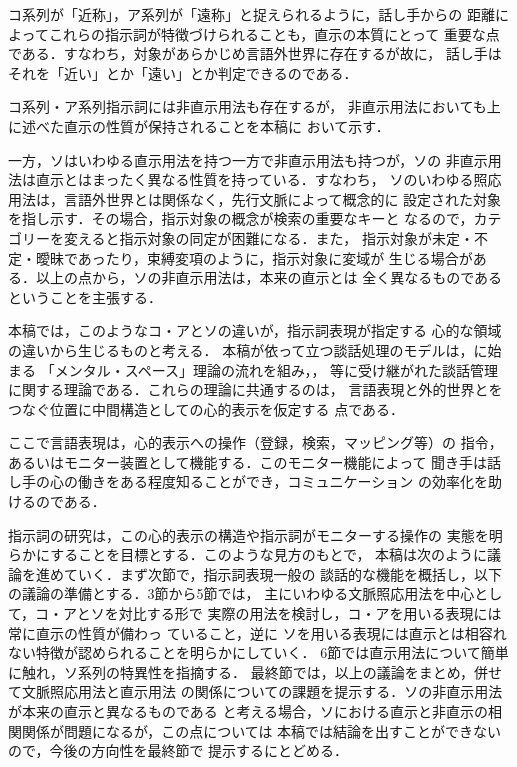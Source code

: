 コ系列が「近称」，ア系列が「遠称」と捉えられるように，話し手からの
距離によってこれらの指示詞が特徴づけられることも，直示の本質にとって
重要な点である．すなわち，対象があらかじめ言語外世界に存在するが故に，
話し手はそれを「近い」とか「遠い」とか判定できるのである．

コ系列・ア系列指示詞には非直示用法も存在するが，
非直示用法においても上に述べた直示の性質が保持されることを本稿に
おいて示す．

一方，ソはいわゆる直示用法を持つ一方で非直示用法も持つが，ソの
非直示用法は直示とはまったく異なる性質を持っている．すなわち，
ソのいわゆる照応用法は，言語外世界とは関係なく，先行文脈によって概念的に
設定された対象を指し示す．その場合，指示対象の概念が検索の重要なキーと
なるので，カテゴリーを変えると指示対象の同定が困難になる．また，
指示対象が未定・不定・曖昧であったり，束縛変項のように，指示対象に変域が
生じる場合がある．以上の点から，ソの非直示用法は，本来の直示とは
全く異なるものであるということを主張する．

本稿では，このようなコ・アとソの違いが，指示詞表現が指定する
心的な領域の違いから生じるものと考える．
本稿が依って立つ談話処理のモデルは，に始まる
「メンタル・スペース」理論の流れを組み，，
等に受け継がれた談話管理に関する理論である．これらの理論に共通するのは，
言語表現と外的世界とをつなぐ位置に中間構造としての心的表示を仮定する
点である．


ここで言語表現は，心的表示への操作（登録，検索，マッピング等）の
指令，あるいはモニター装置として機能する．このモニター機能によって
聞き手は話し手の心の働きをある程度知ることができ，コミュニケーション
の効率化を助けるのである．

指示詞の研究は，この心的表示の構造や指示詞がモニターする操作の
実態を明らかにすることを目標とする．このような見方のもとで，
本稿は次のように議論を進めていく．まず次節で，指示詞表現一般の
談話的な機能を概括し，以下の議論の準備とする．3節から5節では，
主にいわゆる文脈照応用法を中心として，コ・アとソを対比する形で
実際の用法を検討し，コ・アを用いる表現には常に直示の性質が備わっ
ていること，逆に
ソを用いる表現には直示とは相容れない特徴が認められることを明らかにしていく．
6節では直示用法について簡単に触れ，ソ系列の特異性を指摘する．
最終節では，以上の議論をまとめ，併せて文脈照応用法と直示用法
の関係についての課題を提示する．ソの非直示用法が本来の直示と異なるものである
と考える場合，ソにおける直示と非直示の相関関係が問題になるが，この点については
本稿では結論を出すことができないので，今後の方向性を最終節で
提示するにとどめる．


